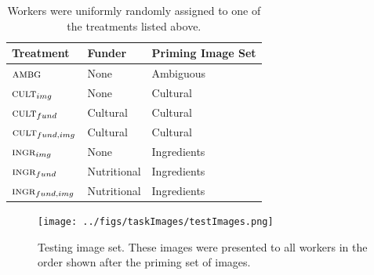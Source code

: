 \documentclass[a4paper]{report}
\begin{document}
\begin{table}[t]
\centering
	\begin{tabular}{ l  l  l }
		\hline                       
		Treatment & Funder & Priming Image Set	\\ 
		\hline                       
		$\textsc{ambg}$ & None & Ambiguous\\
		$\textsc{cult}_{img}$ & None & Cultural\\
		$\textsc{cult}_{fund}$ & Cultural & Cultural\\
		$\textsc{cult}_{fund,img}$ & Cultural & Cultural\\
		$\textsc{ingr}_{img}$ & None & Ingredients\\
		$\textsc{ingr}_{fund}$ & Nutritional & Ingredients\\
		$\textsc{ingr}_{fund, img}$ & Nutritional & Ingredients\\
		\hline  
	\end{tabular}


	\caption{Workers were uniformly randomly
		assigned to one of the treatments listed above.}
	\label{table:1}
\end{table}

\begin{figure}
	\texttt{[image: ../figs/taskImages/testImages.png]}
	\caption{Testing image set. These images were presented to all workers in 
		the order shown after the priming set of images.}
\end{figure}
\end{document}
